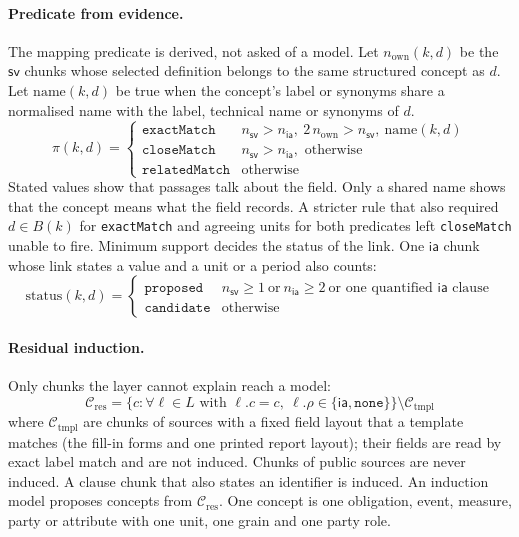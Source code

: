 \documentclass[11pt,a4paper]{article}
\newcommand{\sv}{\mathsf{sv}}
\newcommand{\ia}{\mathsf{ia}}
\begin{document}
\paragraph{Predicate from evidence.}\label{sec:pred}
The mapping predicate is derived, not asked of a model. Let $n_{\mathrm{own}}(k,d)$ be the $\sv$ chunks whose selected definition belongs to the same structured concept as $d$. Let $\mathrm{name}(k,d)$ be true when the concept's label or synonyms share a normalised name with the label, technical name or synonyms of $d$.
\begin{equation}
\pi(k,d) = \begin{cases}
\texttt{exactMatch} & n_{\sv} > n_{\ia},\ 2\,n_{\mathrm{own}} > n_{\sv},\ \mathrm{name}(k,d)\\
\texttt{closeMatch} & n_{\sv} > n_{\ia}, \text{ otherwise}\\
\texttt{relatedMatch} & \text{otherwise}
\end{cases}
\end{equation}
Stated values show that passages talk about the field. Only a shared name shows that the concept means what the field records. A stricter rule that also required $d \in B(k)$ for \texttt{exactMatch} and agreeing units for both predicates left \texttt{closeMatch} unable to fire. %
Minimum support decides the status of the link. One $\ia$ chunk whose link states a value and a unit or a period also counts:
\begin{equation}
\mathrm{status}(k,d) = \begin{cases}\texttt{proposed} & n_{\sv} \ge 1 \ \text{or}\ n_{\ia} \ge 2 \ \text{or one quantified } \ia \text{ clause}\\ \texttt{candidate} & \text{otherwise}\end{cases}
\end{equation}

\paragraph{Residual induction.}
Only chunks the layer cannot explain reach a model:
\begin{equation}
\mathcal{C}_{\mathrm{res}} = \{c : \forall \ell \in L \text{ with } \ell.c=c,\ \ell.\rho \in \{\ia, \texttt{none}\}\} \setminus \mathcal{C}_{\mathrm{tmpl}}
\end{equation}
where $\mathcal{C}_{\mathrm{tmpl}}$ are chunks of sources with a fixed field layout that a template matches (the fill-in forms and one printed report layout); their fields are read by exact label match and are not induced. Chunks of public sources are never induced. A clause chunk that also states an identifier is induced. An induction model proposes concepts from $\mathcal{C}_{\mathrm{res}}$. One concept is one obligation, event, measure, party or attribute with one unit, one grain and one party role. %
\end{document}
